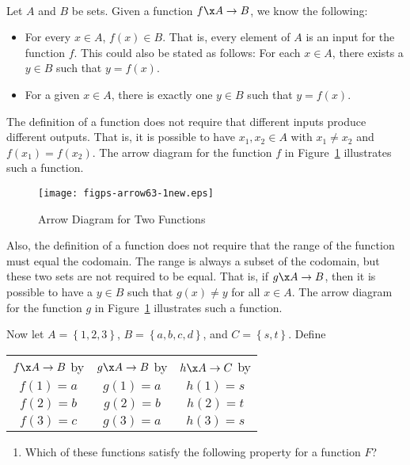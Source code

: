 \begin{previewactivity} \label{PA:functionswithfinitedom} \hfill \\
Let  $A$  and  $B$  be sets.  Given a function  $f\x A \to B$, we know the following:

\begin{itemize}
\item For every  $x \in A$, $f( x ) \in B$.  That is, every element of  $A$  is an input for the function  $f$.  This could also be stated as follows:  For each  $x \in A$, there exists a  $y \in B$ such that  $y = f( x )$.

\item For a given $x  \in A$, there is exactly one  $y \in B$ such that  $y = f( x )$.

\end{itemize}
The definition of a function does not require that different inputs produce different outputs.  That is, it is possible to have  $x_1 , x_2  \in A$ with  
$x_1  \ne x_2 $ and  $f( {x_1 } ) = f( {x_2 } )$.  The arrow diagram for the function $f$ in Figure~\ref{fig:arrow63-1new} illustrates such a function.

\begin{figure}[h]
\begin{center}
\texttt{[image: figps-arrow63-1new.eps]} 
\caption{Arrow Diagram for Two Functions} \label{fig:arrow63-1new}
\end{center}
\end{figure}

Also, the definition of a function does not require that the range of the function must equal the codomain.  The range is always a subset of the codomain, but these two sets are not required to be equal.  That is, if  
$g\x A \to B$, then it is possible to have a  $y \in B$ such that  $g( x ) \ne y$ for all  $x \in A$.  The arrow diagram for the function $g$ in Figure~\ref{fig:arrow63-1new} illustrates such a function.

Now let  $A = \left\{ {1,2,3} \right\}$, $B = \left\{ {a,b,c,d} \right\}$, and 
$C = \left\{ {s,t} \right\}$.  Define

\begin{center}
\begin{tabular}{c | c | c}
$f\x A \to B$ by &  $g\x A \to B$ by &  $h\x A \to C$ by \\
$f( 1 ) = a $  &  $g( 1 ) = a $  &  $h( 1 ) = s $ \\
$f( 2 ) = b $  &  $g( 2 ) = b $  &  $h( 2 ) = t $ \\
$f( 3 ) = c $  &  $g( 3 ) = a $  &  $h( 3 ) = s $
\end{tabular}
\end{center}
%
\begin{enumerate}
\item Which of these functions satisfy the following property for a function  $F$?


\end{enumerate}
\end{previewactivity}
